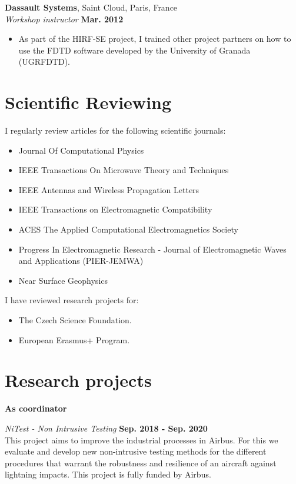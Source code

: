 \documentclass[margin,line]{res}
\begin{document}
\begin{resume}
{\bf Dassault Systems}, Saint Cloud, Paris, France\\
\vspace{-.3cm}
{\em Workshop instructor} \hfill {\bf Mar. 2012}\\
\begin{itemize}
 \item As part of the HIRF-SE project, I trained other project partners on how to use the FDTD
software developed by the University of Granada (UGRFDTD).
\end{itemize}


\section{\sc Scientific Reviewing}
I regularly review articles for the following scientific journals:\\
\begin{itemize}
 \item Journal Of Computational Physics
 \item IEEE Transactions On Microwave Theory and Techniques
 \item IEEE Antennas and Wireless Propagation Letters
 \item IEEE Transactions on Electromagnetic Compatibility
 \item ACES The Applied Computational Electromagnetics Society
 \item Progress In Electromagnetic Research - Journal of Electromagnetic Waves and Applications (PIER-JEMWA)
 \item Near Surface Geophysics
\end{itemize}

I have reviewed research projects for:
\begin{itemize}
	\item The Czech Science Foundation. 
	\item European Erasmus+ Program.
\end{itemize}


\section{\sc Research projects}
{\bf As coordinator}\\[0.15cm]
\begin{minipage}{\textwidth}
	{\em NiTest - Non Intrusive Testing} \hfill {\bf Sep. 2018 - Sep. 2020}\\
	This project aims to improve the industrial processes in Airbus. For this we evaluate and develop new non-intrusive testing methods for the different procedures that warrant the robustness and resilience of an aircraft against lightning impacts. This project is fully funded by Airbus.
\end{minipage}	


\end{resume}
\end{document}
